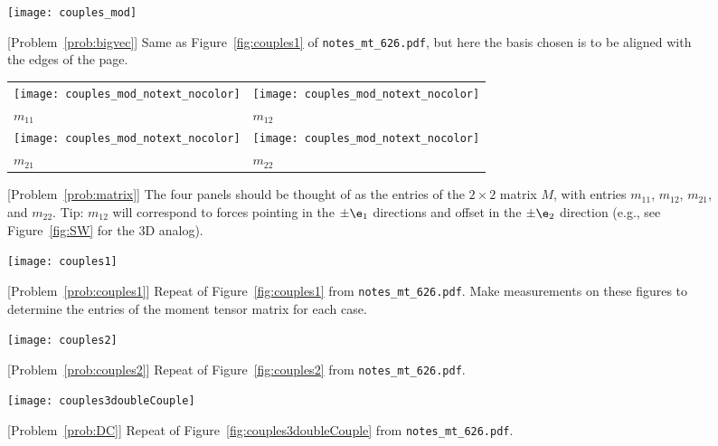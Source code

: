 \documentclass[11pt,titlepage,fleqn]{article}
\newcommand{\mtfile}{\texttt{notes\_mt\_626.pdf}}
\begin{document}
\begin{figure}
\centering
\texttt{[image: couples\_mod]}
\caption{
[Problem~\ref{prob:bigvec}] Same as Figure~\ref{fig:couples1} of \mtfile, but here the basis chosen is to be aligned with the edges of the page.
\label{fig:template}
}
\end{figure}


\begin{figure}
\centering
\begin{tabular}{|l|l|}
\hline
\texttt{[image: couples\_mod\_notext\_nocolor]} & 
\texttt{[image: couples\_mod\_notext\_nocolor]} \\
$m_{11}$ & $m_{12}$ \\ \hline
\texttt{[image: couples\_mod\_notext\_nocolor]} &
\texttt{[image: couples\_mod\_notext\_nocolor]} \\
$m_{21}$ & $m_{22}$ \\ \hline
\end{tabular}
\caption{
[Problem~\ref{prob:matrix}] 
The four panels should be thought of as the entries of the $2 \times 2$ matrix $M$, with entries $m_{11}$, $m_{12}$, $m_{21}$, and $m_{22}$.
Tip: $m_{12}$ will correspond to forces pointing in the $\pm\e_1$ directions and offset in the $\pm\e_2$ direction (e.g., see Figure~\ref{fig:SW} for the 3D analog).
\label{fig:template4}
}
\end{figure}

\begin{figure}
\hspace{-1cm}
\texttt{[image: couples1]}
\caption{
[Problem~\ref{prob:couples1}] Repeat of Figure~\ref{fig:couples1} from \mtfile.
Make measurements on these figures to determine the entries of the moment tensor matrix for each case.
\label{fig:template_couples1}
}
\end{figure}

\begin{figure}
\hspace{-1cm}
\texttt{[image: couples2]}
\caption{
[Problem~\ref{prob:couples2}] 
Repeat of Figure~\ref{fig:couples2} from \mtfile.
\label{fig:template_couples2}
}
\end{figure}

\begin{figure}
\hspace{-1cm}
\texttt{[image: couples3doubleCouple]}
\caption{
[Problem~\ref{prob:DC}] 
Repeat of Figure~\ref{fig:couples3doubleCouple} from \mtfile.
\label{fig:templateDC}
}
\end{figure}
\end{document}
